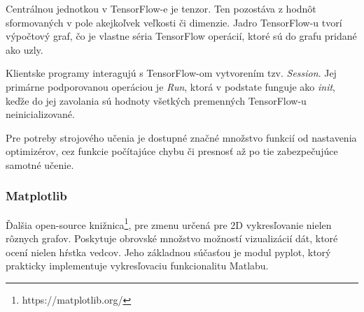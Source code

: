 Centrálnou jednotkou v TensorFlow-e je tenzor. Ten pozostáva z hodnôt sformovaných v pole akejkoľvek veľkosti či dimenzie. Jadro TensorFlow-u tvorí výpočtový graf, čo je vlastne séria TensorFlow operácií, ktoré sú do grafu pridané ako uzly.

Klientske programy interagujú s TensorFlow-om vytvorením tzv. \textit{Session}. Jej primárne podporovanou operáciou je \textit{Run},  ktorá 
v podstate funguje ako \textit{init}, keďže do jej zavolania sú hodnoty všetkých premenných TensorFlow-u neinicializované. 

Pre potreby strojového učenia je dostupné značné množstvo funkcií od nastavenia optimizérov, cez funkcie počítajúce chybu či presnosť až po tie zabezpečujúce samotné učenie. 

\subsubsection{Matplotlib}
Ďalšia open-source knižnica\footnote{https://matplotlib.org/}, pre zmenu určená pre 2D vykresľovanie nielen rôznych grafov. Poskytuje obrovské množstvo možností vizualizácií dát, ktoré ocení nielen hŕstka vedcov. Jeho základnou súčasťou je modul pyplot, ktorý prakticky implementuje vykresľovaciu funkcionalitu Matlabu.
